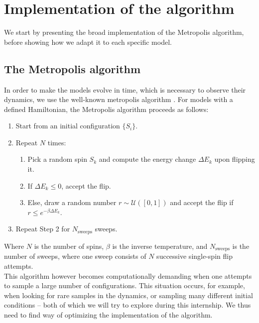 \section{Implementation of the algorithm}
We start by presenting the broad implementation of the Metropolis algorithm, before showing how we adapt it to each specific model.
\subsection{The Metropolis algorithm}
In order to make the models evolve in time, which is necessary to observe their dynamics, we use the well-known metropolis algorithm \cite{Metropolis1953}. For models with a defined Hamiltonian, the Metropolis algorithm proceeds as follows:
\begin{enumerate}
    \item Start from an initial configuration $\{S_i\}$.
    \item Repeat $N$ times:
    \begin{enumerate}[label=\alph*.]
        \item Pick a random spin $S_k$ and compute the energy change $\Delta E_k$
              upon flipping it.
        \item If $\Delta E_k \leq 0$, accept the flip.
        \item Else, draw a random number $r \sim \mathcal{U}([0,1])$
              and accept the flip if $r \leq e^{-\beta \Delta E_k}$.
    \end{enumerate}
    \item Repeat Step 2 for $N_{\text{sweeps}}$ sweeps.
\end{enumerate}
Where $N$ is the number of spins, $\beta$ is the inverse temperature,
and $N_{\text{sweeps}}$ is the number of sweeps, where one sweep consists of
$N$ successive single-spin flip attempts.\\
This algorithm however becomes computationally demanding when one attempts to sample a large number of configurations. This situation occurs, for example, when looking for rare samples in the dynamics, or sampling many different initial conditions -- both of which we will try to explore during this internship. We thus need to find way of optimizing the implementation of the algorithm.

